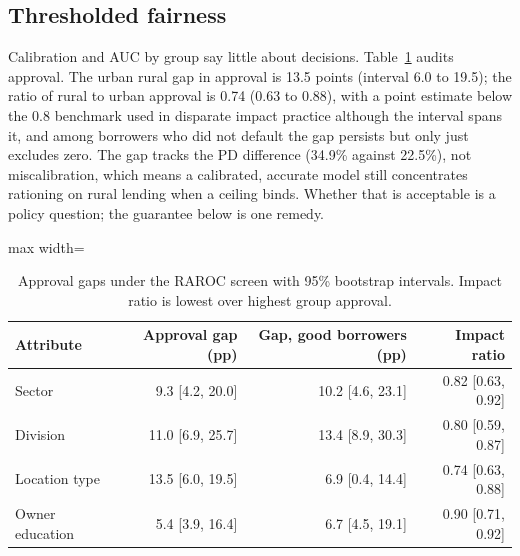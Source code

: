 \documentclass[11pt,a4paper]{article}
\newcommand{\tabsize}{\footnotesize}
\begin{document}
\subsection{Thresholded fairness}
Calibration and AUC by group say little about decisions. Table~\ref{tab:fair} audits approval. The urban rural gap in approval is 13.5 points (interval 6.0 to 19.5); the ratio of rural to urban approval is 0.74 (0.63 to 0.88), with a point estimate below the 0.8 benchmark used in disparate impact practice although the interval spans it, and among borrowers who did not default the gap persists but only just excludes zero. The gap tracks the PD difference (34.9\% against 22.5\%), not miscalibration, which means a calibrated, accurate model still concentrates rationing on rural lending when a ceiling binds. Whether that is acceptable is a policy question; the guarantee below is one remedy.
\begin{table}[H]\centering\tabsize\caption{Approval gaps under the RAROC screen with 95\% bootstrap intervals. Impact ratio is lowest over highest group approval.}\label{tab:fair}
\begin{adjustbox}{max width=\textwidth}
\begin{tabular}{lrrr}
\toprule
Attribute & Approval gap (pp) & Gap, good borrowers (pp) & Impact ratio \\
\midrule
Sector & 9.3 [4.2, 20.0] & 10.2 [4.6, 23.1] & 0.82 [0.63, 0.92] \\
Division & 11.0 [6.9, 25.7] & 13.4 [8.9, 30.3] & 0.80 [0.59, 0.87] \\
Location type & 13.5 [6.0, 19.5] & 6.9 [0.4, 14.4] & 0.74 [0.63, 0.88] \\
Owner education & 5.4 [3.9, 16.4] & 6.7 [4.5, 19.1] & 0.90 [0.71, 0.92] \\
\bottomrule
\end{tabular}
\end{adjustbox}\end{table}
\end{document}
